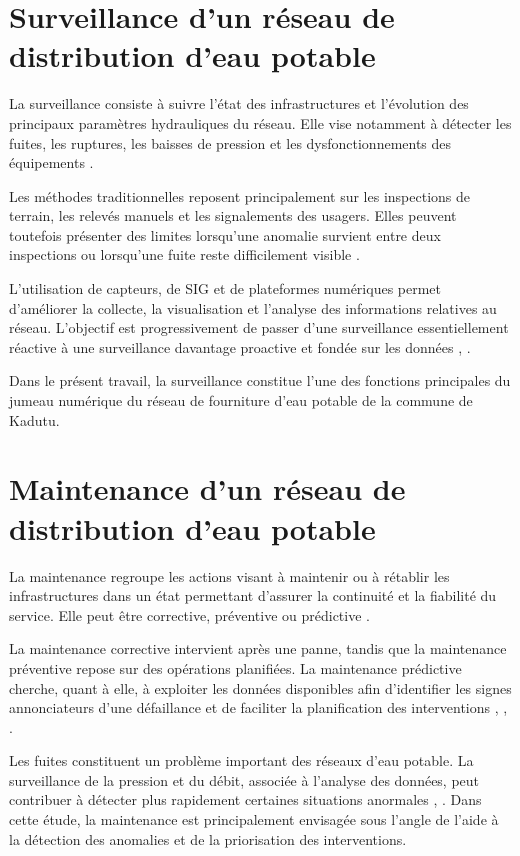 \section{Surveillance d'un réseau de distribution d'eau potable}
\label{surveillance-dun-reseau-de-distribution-deau-potable}

La surveillance consiste à suivre l'état des infrastructures et
l'évolution des principaux paramètres hydrauliques du réseau. Elle vise
notamment à détecter les fuites, les ruptures, les baisses de pression
et les dysfonctionnements des équipements \cite{ref11}.

Les méthodes traditionnelles reposent principalement sur les inspections
de terrain, les relevés manuels et les signalements des usagers. Elles
peuvent toutefois présenter des limites lorsqu'une anomalie survient
entre deux inspections ou lorsqu'une fuite reste difficilement visible
\cite{ref45}.

L'utilisation de capteurs, de SIG et de plateformes numériques permet
d'améliorer la collecte, la visualisation et l'analyse des informations
relatives au réseau. L'objectif est progressivement de passer d'une
surveillance essentiellement réactive à une surveillance davantage
proactive et fondée sur les données \cite{ref20}, \cite{ref47}.

Dans le présent travail, la surveillance constitue l'une des fonctions
principales du jumeau numérique du réseau de fourniture d'eau potable de
la commune de Kadutu.

\section{Maintenance d'un réseau de distribution d'eau potable}
\label{maintenance-dun-reseau-de-distribution-deau-potable}

La maintenance regroupe les actions visant à maintenir ou à rétablir les
infrastructures dans un état permettant d'assurer la continuité et la
fiabilité du service. Elle peut être corrective, préventive ou
prédictive \cite{ref42}.

La maintenance corrective intervient après une panne, tandis que la
maintenance préventive repose sur des opérations planifiées. La
maintenance prédictive cherche, quant à elle, à exploiter les données
disponibles afin d'identifier les signes annonciateurs d'une défaillance
et de faciliter la planification des interventions \cite{ref45},
\cite{ref49}, \cite{ref47}.

Les fuites constituent un problème important des réseaux d'eau potable.
La surveillance de la pression et du débit, associée à l'analyse des
données, peut contribuer à détecter plus rapidement certaines situations
anormales \cite{ref50}, \cite{ref20}. Dans cette étude, la maintenance
est principalement envisagée sous l'angle de l'aide à la détection des
anomalies et de la priorisation des interventions.

